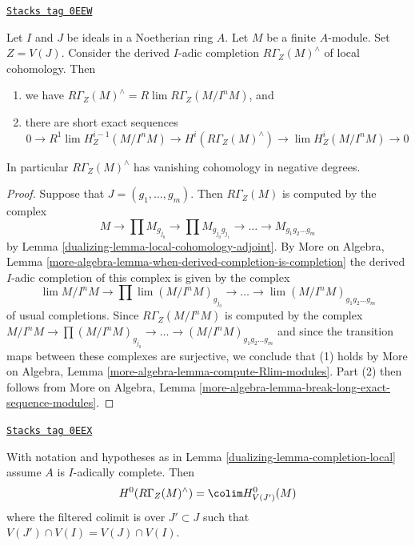 \begin{lemma}
\label{dualizing-lemma-completion-local}
\href{https://stacks.math.columbia.edu/tag/0EEW}{\texttt{Stacks tag 0EEW}}

Let $I$ and $J$ be ideals in a Noetherian ring $A$. Let $M$ be a finite
$A$-module. Set $Z =V(J)$. Consider the derived $I$-adic completion
$R\Gamma_Z(M)^\wedge$ of local cohomology. Then
\begin{enumerate}
\item we have $R\Gamma_Z(M)^\wedge = R\lim R\Gamma_Z(M/I^nM)$, and
\item there are short exact sequences
$$
0 \to R^1\lim H^{i - 1}_Z(M/I^nM) \to H^i(R\Gamma_Z(M)^\wedge) \to
\lim H^i_Z(M/I^nM) \to 0
$$
\end{enumerate}
In particular $R\Gamma_Z(M)^\wedge$ has vanishing cohomology
in negative degrees.
\end{lemma}

\begin{proof}

Suppose that $J = (g_1, \ldots, g_m)$.
Then $R\Gamma_Z(M)$ is computed by the complex
$$
M \to \prod M_{g_{j_0}} \to \prod M_{g_{j_0}g_{j_1}} \to
\ldots \to M_{g_1g_2\ldots g_m}
$$
by Lemma \ref{dualizing-lemma-local-cohomology-adjoint}.
By More on Algebra, Lemma
\ref{more-algebra-lemma-when-derived-completion-is-completion}
the derived $I$-adic completion of
this complex is given by the complex
$$
\lim M/I^nM \to \prod \lim (M/I^nM)_{g_{j_0}} \to
\ldots \to \lim (M/I^nM)_{g_1g_2\ldots g_m}
$$
of usual completions. Since $R\Gamma_Z(M/I^nM)$ is computed by
the complex $ M/I^nM \to \prod (M/I^nM)_{g_{j_0}} \to
\ldots \to (M/I^nM)_{g_1g_2\ldots g_m}$ and since the
transition maps between these complexes are surjective,
we conclude that (1) holds by
More on Algebra, Lemma \ref{more-algebra-lemma-compute-Rlim-modules}.
Part (2) then follows from More on Algebra, Lemma
\ref{more-algebra-lemma-break-long-exact-sequence-modules}.
\end{proof}

\begin{lemma}
\label{dualizing-lemma-completion-local-H0}
\href{https://stacks.math.columbia.edu/tag/0EEX}{\texttt{Stacks tag 0EEX}}

With notation and hypotheses as in Lemma \ref{dualizing-lemma-completion-local}
assume $A$ is $I$-adically complete. Then
$$
H^0(R\Gamma_Z(M)^\wedge) = \colim H^0_{V(J')}(M)
$$
where the filtered colimit is over $J' \subset J$ such that
$V(J') \cap V(I) = V(J) \cap V(I)$.
\end{lemma}


